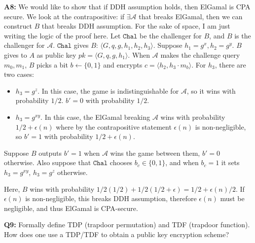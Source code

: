 \documentclass[12pt,reqno]{amsart}
\newcommand{\code}[1]{\texttt{#1}}
\newcommand{\advrs}[0]{\mathcal{A}}
\begin{document}
\textbf{A8:} We would like to show that if DDH assumption holds, then ElGamal is CPA secure. We look at the contrapositive: if $\exists \advrs$ that breaks ElGamal, then we can construct $B$ that breaks DDH assumption.
For the sake of space, I am just writing the logic of the proof here. Let $\code{Chal}$ be the challenger for $B$, and $B$ is the challenger for $\advrs$. $\code{Chal}$ gives $B$: $\langle G, q, g, h_1, h_2, h_3\rangle$. Suppose $h_1 = g^x, h_2 = g^y$. $B$ gives to $A$ as public key $pk = \langle G, q, g, h_1 \rangle$. When $\advrs$ makes the challenge query $m_0, m_1$, $B$ picks a bit $b \gets \{0, 1\}$ and encrypts $c = \langle h_2, h_3 \cdot m_b\rangle$. For $h_3$, there are two cases:
\begin{itemize}
	\item $h_3 = g^z$. In this case, the game is indistinguishable for $\advrs$, so it wins with probability $1/2$. $b' = 0$ with probability $1/2$.
	\item $h_3 = g^{xy}$. In this case, the ElGamal breaking $\advrs$ wins with probability $1/2 + \epsilon(n)$ where by the contrapositive statement $\epsilon(n)$ is non-negligible, so $b' = 1$ with probability $1/2 + \epsilon(n)$.
\end{itemize}
Suppose $B$ outputs $b' = 1$ when $\advrs$ wins the game between them, $b' = 0$ otherwise. Also suppose that $\code{Chal}$ chooses $b_c \in \{0, 1\}$, and when $b_c = 1$ it sets $h_3 = g^{xy}$, $h_3 = g^z$ otherwise.

Here, $B$ wins with probability $1/2(1/2) + 1/2(1/2 + \epsilon) = 1/2 + \epsilon(n)/2$. If $\epsilon(n)$ is non-negligible, this breaks DDH assumption, therefore $\epsilon(n)$ must be negligible, and thus ElGamal is CPA-secure.

\vspace{20px}
\textbf{Q9:} Formally define TDP (trapdoor permutation) and TDF (trapdoor function). How does one use a TDP/TDF to obtain a public key encryption scheme?
\end{document}
